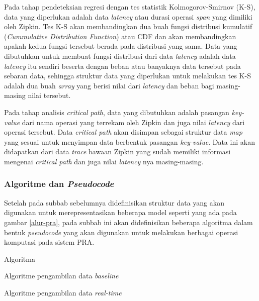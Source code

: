 Pada tahap pendeteksian regresi dengan tes statistik Kolmogorov-Smirnov (K-S), data yang diperlukan adalah data \textit{latency} atau durasi operasi \textit{span} yang dimiliki oleh Zipkin. Tes K-S akan membandingkan dua buah fungsi distribusi kumulatif (\textit{Cummulative Distribution Function}) atau CDF dan akan membandingkan apakah kedua fungsi tersebut berada pada distribusi yang sama. Data yang dibutuhkan untuk membuat fungsi distribusi dari data \textit{latency} adalah data \textit{latency} itu sendiri beserta dengan beban atau banyaknya data tersebut pada sebaran data, sehingga struktur data yang diperlukan untuk melakukan tes K-S adalah dua buah \textit{array} yang berisi nilai dari \textit{latency} dan beban bagi masing-masing nilai tersebut. 



Pada tahap analisis \textit{critical path}, data yang dibutuhkan adalah pasangan \textit{key-value} dari nama operasi yang terrekam oleh Zipkin dan juga nilai \textit{latency} dari operasi tersebut. Data \textit{critical path} akan disimpan sebagai struktur data \textit{map} yang sesuai untuk menyimpan data berbentuk pasangan \textit{key-value}. Data ini akan didapatkan dari data \textit{trace} bawaan Zipkin yang sudah memiliki informasi mengenai \textit{critical path} dan juga nilai \textit{latency} nya masing-masing. 






\subsubsection{Algoritme dan \textit{Pseudocode}}
Setelah pada subbab sebelumnya didefinisikan struktur data yang akan digunakan untuk merepresentasikan beberapa model seperti yang ada pada gambar \ref{alur-pra}, pada subbab ini akan didefinisikan beberapa algoritma dalam bentuk \textit{pseudocode} yang akan digunakan untuk melakukan berbagai operasi komputasi pada sistem PRA.

Algoritma 
\begin{algorithm}[hbt!]
	
	\caption{Algoritme pengambilan data \textit{baseline}}\label{alg:baseline-ret}
\end{algorithm}

\begin{algorithm}[hbt!]
	
	\caption{Algoritme pengambilan data \textit{real-time}}\label{alg:realtime-ret}
\end{algorithm}

